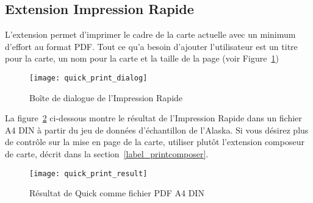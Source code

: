 \subsection{Extension Impression Rapide}


L'extension  permet d'imprimer le cadre de
la carte actuelle avec un minimum d'effort au format PDF. Tout ce qu'a besoin
d'ajouter l'utilisateur est un titre pour la carte, un nom pour la carte et la
taille de la page (voir Figure~\ref{fig:quickprint})
 
\begin{figure}[ht]
   \begin{center}
   \caption{Boîte de dialogue de l'Impression Rapide
\nixcaption}\label{fig:quickprint}\smallskip
   \texttt{[image: quick\_print\_dialog]}
\end{center}
\end{figure}

La figure~\ref{fig:quickprint_result} ci-dessous montre le résultat de l'Impression Rapide dans un fichier A4 DIN à partir du jeu de données d'échantillon de
l'Alaska. Si vous désirez plus de contrôle sur la mise en page de la carte,
utiliser plutôt l'extension composeur de carte, décrit dans la
section~\ref{label_printcomposer}.

\begin{figure}[ht]
   \begin{center}
   \caption{Résultat de Quick comme fichier PDF A4 DIN
\nixcaption}\label{fig:quickprint_result}\smallskip
   \texttt{[image: quick\_print\_result]}
\end{center}
\end{figure}